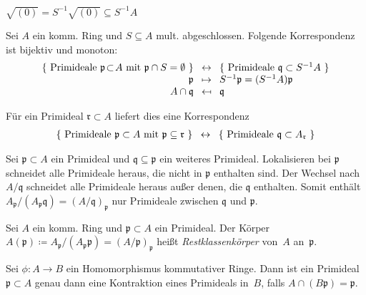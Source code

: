 \documentclass{cheat-sheet}
\newcommand{\ppp}{\mathfrak{p}}
\newcommand{\qqq}{\mathfrak{q}}
\newcommand{\rrr}{\mathfrak{r}}
\begin{document}
\begin{kor}
  $\sqrt{(0)} = S^{-1} \sqrt{(0)} \subseteq S^{-1} A$
\end{kor}


\begin{prop}
  Sei $A$ ein komm. Ring und $S \subseteq A$ mult. abgeschlossen.
  Folgende Korrespondenz ist bijektiv und monoton:
  \[
    \arraycolsep=4pt
    \begin{array}{r c l}
      \{ \text{ Primideale $\ppp \!\subset\! A$ mit $\ppp \cap S = \emptyset$ } \} & \leftrightarrow & \{ \text{ Primideale $\qqq \subset S^{-1} A$ } \} \\
      \ppp & \mapsto & S^{-1} \ppp = (S^{-1} A) \ppp \\
      A \cap \qqq & \mapsfrom & \qqq
    \end{array}
  \]
\end{prop}

\begin{kor}
  Für ein Primideal $\rrr \subset A$ liefert dies eine Korrespondenz
  \[
    \arraycolsep=4pt
    \begin{array}{r c l}
      \{ \text{ Primideale $\ppp \subset A$ mit $\ppp \subseteq \rrr$ } \} & \leftrightarrow & \{ \text{ Primideale $\qqq \subset A_\rrr$ } \}
    \end{array}
  \]
\end{kor}

\begin{bem}
  Sei $\ppp \subset A$ ein Primideal und $\qqq \subseteq \ppp$ ein weiteres Primideal.
  Lokalisieren bei $\ppp$ schneidet alle Primideale heraus, die nicht in $\ppp$ enthalten sind.
  Der Wechsel nach $A/\qqq$ schneidet alle Primideale heraus außer denen, die $\qqq$ enthalten.
  Somit enthält $A_\ppp / (A_\ppp \qqq) = (A/\qqq)_\ppp$ nur Primideale zwischen $\qqq$ und $\ppp$.
\end{bem}

\begin{defn}
  Sei $A$ ein komm. Ring und $\ppp \subset A$ ein Primideal.
  Der Körper $A(\ppp) \coloneqq A_\ppp / (A_\ppp \ppp) = (A/\ppp)_\ppp$ heißt \emph{Restklassenkörper} von~$A$ an~$\ppp$.
\end{defn}

\begin{prop}
  Sei $\phi : A \to B$ ein Homomorphismus kommutativer Ringe.
  Dann ist ein Primideal $\ppp \subset A$ genau dann eine Kontraktion eines Primideals in~$B$, falls $A \cap (B \ppp) = \ppp$.
\end{prop}
\end{document}
